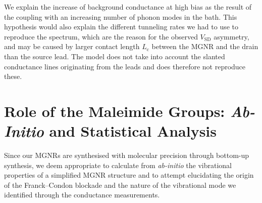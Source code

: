 \begin{table}
    \caption{\label{tab:simulated_stability_diagram}
        Simulation parameter for the vibrational electron transport model}
\end{table}
%
We explain the increase of background conductance at high bias as the result of the coupling with an increasing number of phonon modes in the bath. This hypothesis would also explain the different tunneling rates we had to use to reproduce the spectrum, which are the reason for the observed $V_\textrm{SD}$ asymmetry, and may be caused by larger contact length $L_\textrm{c}$ between the \gls{MGNR} and the drain than the source lead. The model does not take into account the slanted conductance lines originating from the leads and does therefore not reproduce these.



\section{Role of the Maleimide Groups: \textit{Ab-Initio} and Statistical Analysis}

Since our \glspl{MGNR} are synthesised with molecular precision through bottom-up synthesis, we deem appropriate to calculate from \textit{ab-initio} the vibrational properties of a simplified \gls{MGNR} structure and to attempt elucidating the origin of the Franck--Condon blockade and the nature of the vibrational mode we identified through the conductance measurements.

